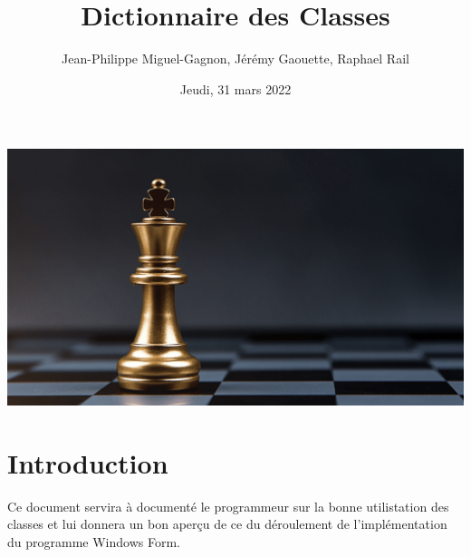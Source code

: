 \documentclass[12pt, letterpaper, twoside]{article}
\title{Dictionnaire des Classes}
\author{Jean-Philippe Miguel-Gagnon, Jérémy Gaouette, Raphael Rail}
\date{Jeudi, 31 mars 2022}
\begin{document}
\begin{titlepage}
\maketitle
\includegraphics[width=\textwidth]{CHESS}
\end{titlepage}

\tableofcontents

\newpage

\section{Introduction}

Ce document servira à documenté le programmeur sur la bonne utilistation
des classes et lui donnera un bon aperçu de ce du déroulement de l'implémentation 
du programme Windows Form.
\end{document}
